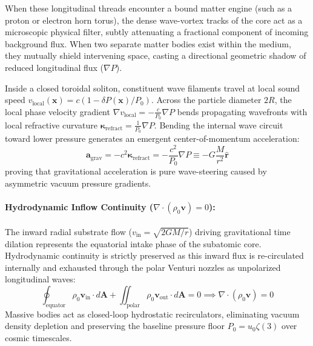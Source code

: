 \documentclass[11pt,a4paper]{article}
\begin{document}
	When these longitudinal threads encounter a bound matter engine (such as a proton or electron horn torus), the dense wave-vortex tracks of the core act as a microscopic physical filter, subtly attenuating a fractional component of incoming background flux. When two separate matter bodies exist within the medium, they mutually shield intervening space, casting a directional geometric shadow of reduced longitudinal flux ($\nabla P$).
	
	Inside a closed toroidal soliton, constituent wave filaments travel at local sound speed $v_{\text{local}}(\mathbf{x}) = c (1 - \delta P(\mathbf{x})/P_0)$. Across the particle diameter $2R$, the local phase velocity gradient $\nabla v_{\text{local}} = -\frac{c}{P_0}\nabla P$ bends propagating wavefronts with local refractive curvature $\boldsymbol{\kappa}_{\text{refract}} = \frac{1}{P_0}\nabla P$. Bending the internal wave circuit toward lower pressure generates an emergent center-of-momentum acceleration:
	\begin{equation}
		\mathbf{a}_{\text{grav}} = -c^2 \boldsymbol{\kappa}_{\text{refract}} = -\frac{c^2}{P_0} \nabla P \equiv -G \frac{M}{r^2} \hat{\mathbf{r}}
	\end{equation}
	proving that gravitational acceleration is pure wave-steering caused by asymmetric vacuum pressure gradients.
	
	\paragraph{Hydrodynamic Inflow Continuity ($\nabla \cdot (\rho_0 \mathbf{v}) = 0$):}
	The inward radial substrate flow ($v_{\text{in}} = \sqrt{2GM/r}$) driving gravitational time dilation represents the equatorial intake phase of the subatomic core. Hydrodynamic continuity is strictly preserved as this inward flux is re-circulated internally and exhausted through the polar Venturi nozzles as unpolarized longitudinal waves:
	\begin{equation}
		\oint_{\text{equator}} \rho_0 \mathbf{v}_{\text{in}} \cdot d\mathbf{A} + \iint_{\text{polar}} \rho_0 \mathbf{v}_{\text{out}} \cdot d\mathbf{A} = 0 \implies \nabla \cdot (\rho_0 \mathbf{v}) = 0
	\end{equation}
	Massive bodies act as closed-loop hydrostatic recirculators, eliminating vacuum density depletion and preserving the baseline pressure floor $P_0 = u_0 \zeta(3)$ over cosmic timescales.
	
\end{document}
